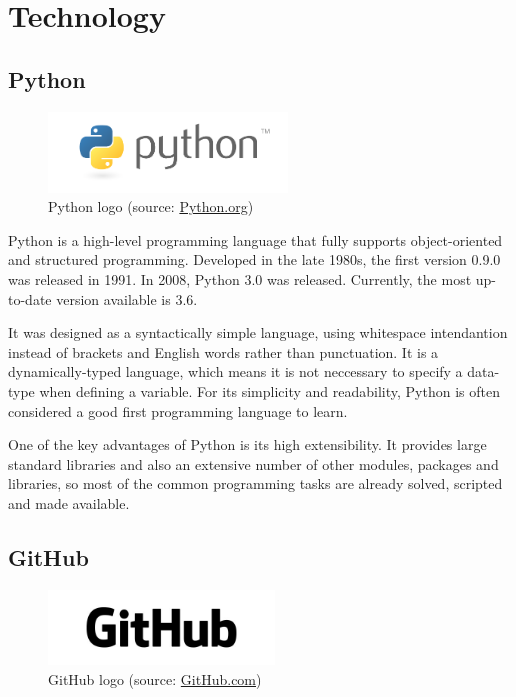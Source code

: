 \chapter{Technology}
\label{3-technologie}


\section{Python}

\begin{figure}[H] \centering
      \includegraphics[width=180pt]{./pictures/python-logo-master-v3-TM.png}
      \caption[Python logo]{Python logo (source:
\href{https://www.python.org/static/community_logos/python-logo-master-v3-TM.png}{Python.org})}
      \label{fig:python}
  \end{figure}

  Python is a high-level programming language that fully supports
  object-oriented and structured programming. Developed in the late
  1980s, the first version 0.9.0 was released in 1991. In 2008, Python
  3.0 was released. Currently, the most up-to-date version available
  is 3.6.\cite{diveintopython}

  It was designed as a syntactically simple language, using whitespace
  intendantion instead of brackets and English words rather than
  punctuation. It is a dynamically-typed language, which means it is
  not neccessary to specify a data-type when defining a variable. For
  its simplicity and readability, Python is often considered a good
  first programming language to learn.

  One of the key advantages of Python is its high extensibility. It
  provides large standard libraries and also an extensive number of
  other modules, packages and libraries, so most of the common
  programming tasks are already solved, scripted and made available.



\section{GitHub}

\begin{figure}[H] \centering
      \includegraphics[width=170pt]{./pictures/github.png}
      \caption[GitHub logo]{GitHub logo (source:
\href{GitHub}{GitHub.com})}
      \label{fig:GitHub}
  \end{figure}

